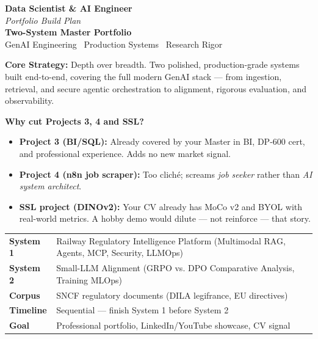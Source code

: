 \documentclass[11pt,a4paper]{article}
\begin{document}
\begin{titlepage}
\vspace*{2cm}
\begin{center}
{\LARGE\bfseries Data Scientist \& AI Engineer}\\[0.4em]
{\large\itshape Portfolio Build Plan}\\[1em]
{\LARGE\bfseries Two-System Master Portfolio}\\[0.6em]
{\large GenAI Engineering \textbullet\ Production Systems \textbullet\ Research Rigor}\\[2cm]
\end{center}

\noindent\textbf{Core Strategy:} Depth over breadth. Two polished, production-grade systems built end-to-end, covering the full modern GenAI stack — from ingestion, retrieval, and secure agentic orchestration to alignment, rigorous evaluation, and observability. 

\vspace{1.5cm}
\noindent\textbf{Why cut Projects 3, 4 and SSL?}
\begin{itemize}
    \item\textbf{Project 3 (BI/SQL):} Already covered by your Master in BI, DP-600 cert, and professional experience. Adds no new market signal.
    \item\textbf{Project 4 (n8n job scraper):} Too cliché; screams \emph{job seeker} rather than \emph{AI system architect}.
    \item\textbf{SSL project (DINOv2):} Your CV already has MoCo v2 and BYOL with real-world metrics. A hobby demo would dilute — not reinforce — that story.
\end{itemize}

\vspace{1.5cm}
\begin{center}
\small
\begin{tabularx}{0.9\textwidth}{l X}
    \toprule
    \textbf{System 1} & Railway Regulatory Intelligence Platform (Multimodal RAG, Agents, MCP, Security, LLMOps) \\
    \textbf{System 2} & Small-LLM Alignment (GRPO vs. DPO Comparative Analysis, Training MLOps) \\
    \textbf{Corpus}   & SNCF regulatory documents (DILA legifrance, EU directives) \\
    \textbf{Timeline} & Sequential — finish System 1 before System 2 \\
    \textbf{Goal}     & Professional portfolio, LinkedIn/YouTube showcase, CV signal \\
    \bottomrule
\end{tabularx}
\end{center}
\end{titlepage}
\end{document}
